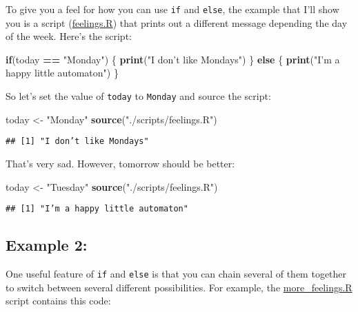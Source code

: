 \documentclass[]{book}
\newenvironment{Shaded}{\begin{snugshade}}{\end{snugshade}}
\newcommand{\ControlFlowTok}[1]{\textcolor[rgb]{0.13,0.29,0.53}{\textbf{#1}}}
\newcommand{\KeywordTok}[1]{\textcolor[rgb]{0.13,0.29,0.53}{\textbf{#1}}}
\newcommand{\NormalTok}[1]{#1}
\newcommand{\OperatorTok}[1]{\textcolor[rgb]{0.81,0.36,0.00}{\textbf{#1}}}
\newcommand{\StringTok}[1]{\textcolor[rgb]{0.31,0.60,0.02}{#1}}
\begin{document}
To give you a feel for how you can use \texttt{if} and \texttt{else}, the example that I'll show you is a script (\href{./scripts/feelings.R}{feelings.R}) that prints out a different message depending the day of the week. Here's the script:

\begin{Shaded}
\begin{Highlighting}[]
\ControlFlowTok{if}\NormalTok{(today }\OperatorTok{==}\StringTok{ "Monday"}\NormalTok{) \{}
  \KeywordTok{print}\NormalTok{(}\StringTok{"I don’t like Mondays"}\NormalTok{)}
\NormalTok{\} }\ControlFlowTok{else}\NormalTok{ \{}
  \KeywordTok{print}\NormalTok{(}\StringTok{"I’m a happy little automaton"}\NormalTok{)}
\NormalTok{\}}
\end{Highlighting}
\end{Shaded}

So let's set the value of \texttt{today} to \texttt{Monday} and source the script:

\begin{Shaded}
\begin{Highlighting}[]
\NormalTok{today <-}\StringTok{ "Monday"}
\KeywordTok{source}\NormalTok{(}\StringTok{"./scripts/feelings.R"}\NormalTok{)}
\end{Highlighting}
\end{Shaded}

\begin{verbatim}
## [1] "I don’t like Mondays"
\end{verbatim}

That's very sad. However, tomorrow should be better:

\begin{Shaded}
\begin{Highlighting}[]
\NormalTok{today <-}\StringTok{ "Tuesday"}
\KeywordTok{source}\NormalTok{(}\StringTok{"./scripts/feelings.R"}\NormalTok{)}
\end{Highlighting}
\end{Shaded}

\begin{verbatim}
## [1] "I’m a happy little automaton"
\end{verbatim}

\hypertarget{example-2}{%
\subsection{Example 2:}\label{example-2}}

One useful feature of \texttt{if} and \texttt{else} is that you can chain several of them together to switch between several different possibilities. For example, the \href{./scripts/more_feelings.R}{more\_feelings.R} script contains this code:
\end{document}

